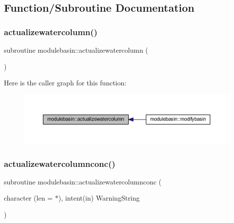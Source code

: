 \subsection{Function/\+Subroutine Documentation}
\mbox{\label{namespacemodulebasin_a6b7803a58ac882de2847f5af4c47cf02}} 
\subsubsection{\texorpdfstring{actualizewatercolumn()}{actualizewatercolumn()}}
{\footnotesize\ttfamily subroutine modulebasin\+::actualizewatercolumn (\begin{DoxyParamCaption}{ }\end{DoxyParamCaption})\hspace{0.3cm}{\ttfamily [private]}}

Here is the caller graph for this function\+:\nopagebreak
\begin{figure}[H]
\begin{center}
\leavevmode
\includegraphics[width=350pt]{namespacemodulebasin_a6b7803a58ac882de2847f5af4c47cf02_icgraph}
\end{center}
\end{figure}
\mbox{\label{namespacemodulebasin_a3ad94088588cc4ac448ba73dc73a3f61}} 
\subsubsection{\texorpdfstring{actualizewatercolumnconc()}{actualizewatercolumnconc()}}
{\footnotesize\ttfamily subroutine modulebasin\+::actualizewatercolumnconc (\begin{DoxyParamCaption}\item[{character (len = $\ast$), intent(in)}]{Warning\+String }\end{DoxyParamCaption})\hspace{0.3cm}{\ttfamily [private]}}

